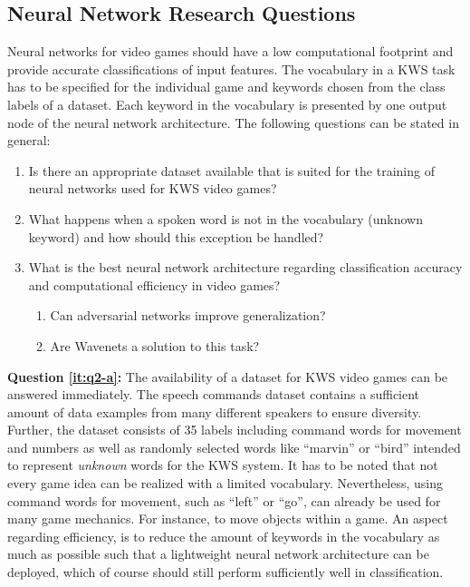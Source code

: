 \subsection{Neural Network Research Questions}\label{sec:intro_rq_nn}
Neural networks for video games should have a low computational footprint and provide accurate classifications of input features.
The vocabulary in a KWS task has to be specified for the individual game and keywords chosen from the class labels of a dataset.
Each keyword in the vocabulary is presented by one output node of the neural network architecture.
The following questions can be stated in general:
\begin{enumerate}[label={Q.2.\alph*)}, leftmargin=1.75cm]
  \item Is there an appropriate dataset available that is suited for the training of neural networks used for KWS video games?\label{it:q2-a}
  \item What happens when a spoken word is not in the vocabulary (unknown keyword) and how should this exception be handled?\label{it:q2-b}
  \item What is the best neural network architecture regarding classification accuracy and computational efficiency in video games?\label{it:q2-c}
  \begin{enumerate}[label=(\roman*)]
    \item Can adversarial networks improve generalization?
    \item Are Wavenets a solution to this task?
  \end{enumerate}
\end{enumerate}
\noindent
\textbf{Question \ref{it:q2-a}:} 
The availability of a dataset for KWS video games can be answered immediately. 
The speech commands dataset \cite{Warden2018SpeechCommands} contains a sufficient amount of data examples from many different speakers to ensure diversity.
Further, the dataset consists of 35 labels including command words for movement and numbers as well as randomly selected words like \enquote{marvin} or \enquote{bird} intended to represent \emph{unknown} words for the KWS system.
It has to be noted that not every game idea can be realized with a limited vocabulary.
Nevertheless, using command words for movement, such as \enquote{left} or \enquote{go}, can already be used for many game mechanics.
For instance, to move objects within a game.
An aspect regarding efficiency, is to reduce the amount of keywords in the vocabulary as much as possible such that a lightweight neural network architecture can be deployed, which of course should still perform sufficiently well in classification.

